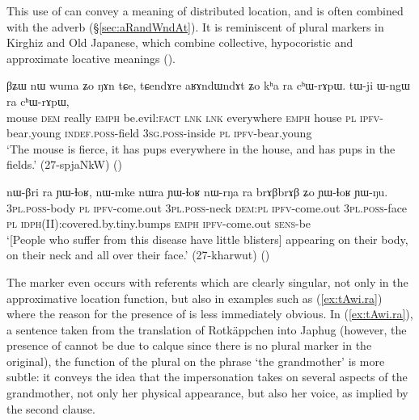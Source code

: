 This use of  can convey a meaning of distributed location, and is often combined with the adverb  (§\ref{sec:aRandWndAt}). It is reminiscent of plural markers in Kirghiz and Old Japanese, which combine collective, hypocoristic and approximate locative meanings (\citealt[195]{antonov07ra}).

\begin{exe}
\ex \label{ex:kha.ra}
\gll βʑɯ nɯ wuma ʑo ŋɤn tɕe, tɕendɤre aʁɤndɯndɤt ʑo kʰa ra cʰɯ-rɤpɯ. tɯ-ji ɯ-ngɯ ra cʰɯ-rɤpɯ, \\
mouse \textsc{dem} really \textsc{emph} be.evil:\textsc{fact} \textsc{lnk} \textsc{lnk} everywhere \textsc{emph} house \textsc{pl} \textsc{ipfv}-bear.young \textsc{indef}.\textsc{poss}-field \textsc{3sg}.\textsc{poss}-inside \textsc{pl}  \textsc{ipfv}-bear.young \\
\glt `The mouse is fierce, it has pups everywhere in the house, and has pups in the fields.' (27-spjaNkW)
()
\end{exe} 

\begin{exe}
\ex \label{ex:nWrNa.ra}
\gll nɯ-βri ra ɲɯ-ɬoʁ, nɯ-mke nɯra ɲɯ-ɬoʁ nɯ-rŋa ra brɤβbrɤβ ʑo ɲɯ-ɬoʁ ɲɯ-ŋu. \\
\textsc{3pl}.\textsc{poss}-body \textsc{pl} \textsc{ipfv}-come.out \textsc{3pl}.\textsc{poss}-neck \textsc{dem}:\textsc{pl} \textsc{ipfv}-come.out \textsc{3pl}.\textsc{poss}-face \textsc{pl} \textsc{idph}(II):covered.by.tiny.bumps \textsc{emph} \textsc{ipfv}-come.out  \textsc{sens}-be \\
\glt `[People who suffer from this disease have little blisters] appearing on their body, on their neck and all over their face.' (27-kharwut)
()
\end{exe} 

The marker  even occurs with referents which are clearly singular, not only in the approximative location function, but also in examples such as (\ref{ex:tAwi.ra}) where the reason for the presence of  is less immediately obvious. In (\ref{ex:tAwi.ra}), a sentence taken from the translation of Rotkäppchen into Japhug (however, the presence of  cannot be due to calque since there is no plural marker in the original), the function of the plural on the phrase  `the grandmother' is more subtle: it conveys the idea that the impersonation takes on several aspects of the grandmother, not only her physical appearance, but also her voice, as implied by the second clause. 


